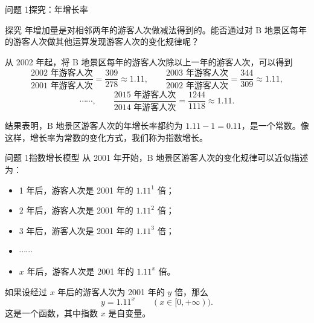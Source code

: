 \documentclass[aspectratio=169,11pt,t,fleqn]{ctexbeamer}
\begin{document}
\begin{frame}{问题 1\quad 探究：年增长率}
  \begin{block}{探究}
    年增加量是对相邻两年的游客人次做减法得到的。能否通过对 B 地景区每年的游客人次做其他运算发现游客人次的变化规律呢？
  \end{block}
\pause
  从 2002 年起，将 B 地景区每年的游客人次除以上一年的游客人次，可以得到
  \[
    \frac{2002\text{ 年游客人次}}{2001\text{ 年游客人次}}=\frac{309}{278}\approx 1.11,\qquad
    \frac{2003\text{ 年游客人次}}{2002\text{ 年游客人次}}=\frac{344}{309}\approx 1.11,
    \]
  \[
    \cdots\cdots,\qquad
    \frac{2015\text{ 年游客人次}}{2014\text{ 年游客人次}}=\frac{1244}{1118}\approx 1.11.
  \]

  结果表明，B 地景区游客人次的\alert{年增长率}都约为 $1.11-1=0.11$，是一个常数。像这样，增长率为常数的变化方式，我们称为\alert{指数增长}。
\end{frame}

\begin{frame}{问题 1\quad 指数增长模型}
  从 2001 年开始，B 地景区游客人次的变化规律可以近似描述为：
  \begin{itemize}
    \item 1 年后，游客人次是 2001 年的 $1.11^1$ 倍；
    \item 2 年后，游客人次是 2001 年的 $1.11^2$ 倍；
    \item 3 年后，游客人次是 2001 年的 $1.11^3$ 倍；
    \item $\cdots\cdots$
    \item $x$ 年后，游客人次是 2001 年的 $1.11^x$ 倍。
  \end{itemize}

  \vspace{0.6em}
  如果设经过 $x$ 年后的游客人次为 2001 年的 $y$ 倍，那么
  \[
    y=1.11^x\qquad (x\in[0,+\infty)). \tag{1}
  \]
  这是一个函数，其中指数 $x$ 是自变量。
\end{frame}

\end{document}
